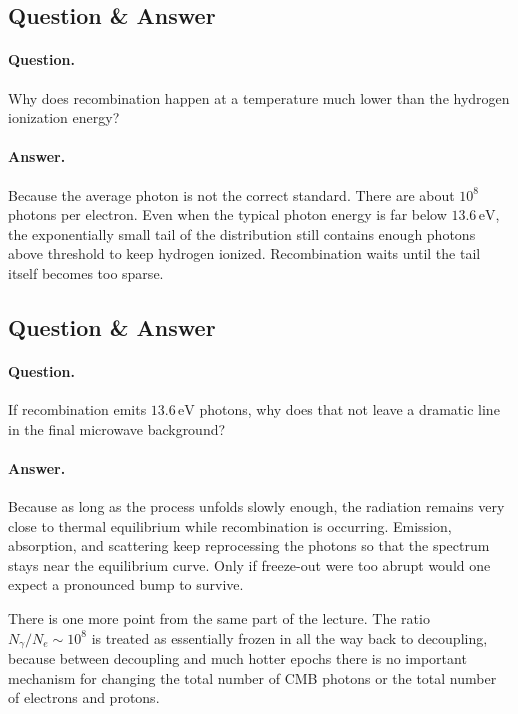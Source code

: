\subsection{Question \& Answer}

\paragraph{Question.} Why does recombination happen at a temperature much lower than the hydrogen ionization energy?

\paragraph{Answer.} Because the average photon is not the correct standard. There are about \(10^8\) photons per electron. Even when the typical photon energy is far below \(13.6\,\mathrm{eV}\), the exponentially small tail of the distribution still contains enough photons above threshold to keep hydrogen ionized. Recombination waits until the tail itself becomes too sparse.

\subsection{Question \& Answer}

\paragraph{Question.} If recombination emits \(13.6\,\mathrm{eV}\) photons, why does that not leave a dramatic line in the final microwave background?

\paragraph{Answer.} Because as long as the process unfolds slowly enough, the radiation remains very close to thermal equilibrium while recombination is occurring. Emission, absorption, and scattering keep reprocessing the photons so that the spectrum stays near the equilibrium curve. Only if freeze-out were too abrupt would one expect a pronounced bump to survive.

There is one more point from the same part of the lecture. The ratio \(N_\gamma/N_e \sim 10^8\) is treated as essentially frozen in all the way back to decoupling, because between decoupling and much hotter epochs there is no important mechanism for changing the total number of CMB photons or the total number of electrons and protons.

